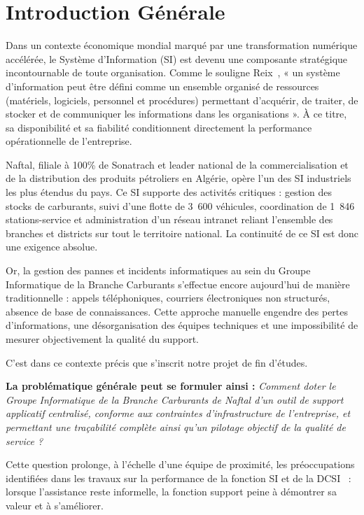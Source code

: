 \chapter*{Introduction Générale}

Dans un contexte économique mondial marqué par une transformation numérique
accélérée, le Système d'Information (SI) est devenu une composante stratégique
incontournable de toute organisation. Comme le souligne Reix~\cite{reix1995}, « un
système d'information peut être défini comme un ensemble organisé de ressources
(matériels, logiciels, personnel et procédures) permettant d'acquérir, de traiter, de stocker
et de communiquer les informations dans les organisations ». À ce titre, sa disponibilité
et sa fiabilité conditionnent directement la performance opérationnelle de l'entreprise.

Naftal, filiale à 100\% de Sonatrach et leader national de la commercialisation et
de la distribution des produits pétroliers en Algérie, opère l'un des SI industriels les
plus étendus du pays. Ce SI supporte des activités critiques : gestion des stocks de
carburants, suivi d'une flotte de 3~600 véhicules, coordination de 1~846 stations-service
et administration d'un réseau intranet reliant l'ensemble des branches et districts sur
tout le territoire national. La continuité de ce SI est donc une exigence absolue.

Or, la gestion des pannes et incidents informatiques au sein du Groupe Informatique
de la Branche Carburants s'effectue encore aujourd'hui de manière traditionnelle : appels
téléphoniques, courriers électroniques non structurés, absence de base de connaissances.
Cette approche manuelle engendre des pertes d'informations, une désorganisation des
équipes techniques et une impossibilité de mesurer objectivement la qualité du support.

C'est dans ce contexte précis que s'inscrit notre projet de fin d'études.

\medskip
\noindent\textbf{La problématique générale peut se formuler ainsi :} \emph{Comment doter le Groupe
Informatique de la Branche Carburants de Naftal d'un outil de support applicatif centralisé,
conforme aux contraintes d'infrastructure de l'entreprise, et permettant une traçabilité complète
ainsi qu'un pilotage objectif de la qualité de service ?}
\medskip

Cette question prolonge, à l'échelle d'une équipe de proximité, les préoccupations identifiées
dans les travaux sur la performance de la fonction SI et de la DCSI~\cite{meghari2014} : lorsque
l'assistance reste informelle, la fonction support peine à démontrer sa valeur et à s'améliorer.


